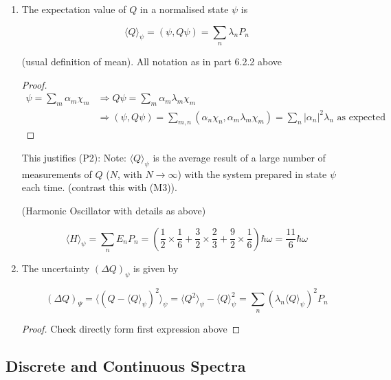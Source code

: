 \documentclass[a4paper]{article}
\begin{document}
\begin{enumerate}
	\item The expectation value of $ Q $ in a normalised state $ \psi $ is
	
	\[ \langle Q \rangle_{\psi}  = (\psi, Q \psi) = \sum_{n} \lambda_{n} P_{n} \]
	
	(usual definition of mean). All notation as in part 6.2.2 above
	
	\begin{proof}
		\begin{align*}
		\psi = \sum_{m} \alpha_{m} \chi_{m} & \Rightarrow Q \psi = \sum_{m} \alpha_{m} \lambda_{m} \chi_{m} \\
		& \Rightarrow (\psi,Q\psi) = \sum_{m,n} (\alpha_{n}\chi_{n}, \alpha_{m} \lambda_{m} \chi_{m} ) = \sum_{n} | \alpha_{n} |^{2} \lambda_{n} \text{ as expected}
		\end{align*}
	\end{proof}

This justifies (P2):
Note: $ \langle Q \rangle_{\psi} $ is the average result of a large number of measurements of $ Q $ ($ N $, with $ N \to \infty $) with the system prepared in state $ \psi $ each time. (contrast this with (M3)).

\begin{eg} (Harmonic Oscillator with details as above)
	
	\[ \langle H \rangle_{\psi}  = \sum_{n} E_{n} P_{n} = ( \frac{1}{2} \times \frac{1}{6}   + \frac{3}{2} \times \frac{2}{3} + \frac{9}{2} \times \frac{1}{6}  )\hbar \omega = \frac{11}{6} \hbar \omega \]
	
\end{eg}
	
	
	\item The uncertainty $ (\Delta Q)_{\psi} $ is given by
	
	\[ (\Delta Q)_{\Psi} = \langle (Q - \langle Q \rangle_{\psi})^{2} \rangle_{\psi} = \langle Q^{2} \rangle_{\psi} - \langle Q \rangle_{\psi}^{2} = \sum_{n} (\lambda_{n} \langle Q \rangle_{\psi} )^{2} P_{n} \]
	
	\begin{proof}
		Check directly form first expression above 
	\end{proof}
\end{enumerate}

\subsection{Discrete and Continuous Spectra}
\end{document}
